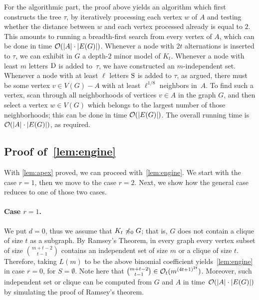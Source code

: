 For the algorithmic part, the proof above yields an algorithm which first constructs the tree $\tau$, by 
iteratively processing each vertex $w$ of $A$ and testing whether the distance between $w$ and each vertex processed already is equal to $2$.
This amounts to running a breadth-first search from every vertex of $A$, which can be done in time $\mathcal{O}(|A|\cdot |E(G)|)$.
Whenever a node with $2t$ alternations 
is inserted to $\tau$, we can exhibit in $G$ a depth-$2$ minor model of $K_t$.
Whenever a node with least $m$ letters $\mathrm{D}$ is added to~$\tau$,
we have constructed an $m$-independent set. Whenever a node with at least $\ell$ letters $\mathrm{S}$ is added to $\tau$, as argued, there must be some vertex $v\in V(G)-A$ with at least $\ell^{1/8}$ neighbors in~$A$. 
To find such a vertex, scan through all neighborhoods of vertices $v\in A$ in the graph $G$, and then select a vertex $w\in V(G)$
which belongs to the largest number of those neighborhoods; this can be done in time $\mathcal{O}(|E(G)|)$.
The overall running time is $\mathcal{O}(|A|\cdot |E(G)|)$, as required.


\subsection{Proof of~\cref{lem:engine}}
\label{sec:engine}

With \cref{lem:apex} proved, we can proceed with~\cref{lem:engine}. 
We start with the case $r=1$, then we move to the case $r=2$. 
Next, we show how the general case reduces to one of those two cases.

\paragraph{Case $r=1$.}
We put $d=0$, thus we assume that $K_t\not\preccurlyeq_0 G$; that is, $G$ does not contain a clique of size $t$ as a subgraph. By Ramsey's Theorem, in every graph every vertex subset of size $\binom{m+t-2}{t-1}$ contains an
independent set of size $m$ or a clique of size $t$. Therefore, 
taking $L(m)$ to be the above binomial coefficient yields~\cref{lem:engine} in case $r=0$, for $S=\emptyset$. Note here that $\binom{m+t-2}{t-1}\in\mathcal{O}_{t}{(m^{{(4t+1)}^{2t}})}$.
Moreover, such independent set or clique can be computed from $G$ and $A$ in time~$\mathcal{O}(|A|\cdot |E(G)|)$ by simulating the proof of Ramsey's theorem.

